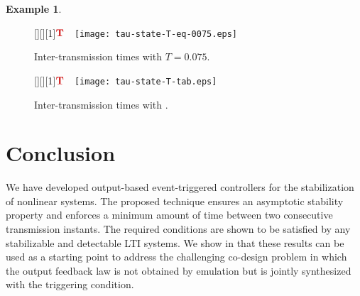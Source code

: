 \documentclass[a4paper, 9pt, twocolumn]{IEEEtran}
\theoremstyle{plain}
\theoremstyle{definition}
\newtheorem{exmple}{Example}
\begin{document}
\begin{exmple}
\begin{figure}[H]
\centering
{}[][][1]{\scriptsize $\color{Red3}\textbf{T}\,\,\,\,$}
\texttt{[image: tau-state-T-eq-0075.eps]}\caption{Inter-transmission times with $T = 0.075$.}
\label{fig:tau-state-clock}
\end{figure}

\begin{figure}[H]
\centering
{}[][][1]{\scriptsize $\color{Red3}\textbf{T}\,\,\,\,$}
\texttt{[image: tau-state-T-tab.eps]} \caption{Inter-transmission times with \cite{Tabuada2007event}.}
\label{fig:tau-state-Tabuada}
\end{figure}
\end{exmple}


\section{Conclusion} \label{sec: conclusions}
We have developed output-based event-triggered controllers for the stabilization of nonlinear systems. The proposed technique ensures an asymptotic stability property and enforces a minimum amount of time between two consecutive transmission instants. The required conditions are shown to be satisfied by any stabilizable and detectable LTI systems. We show in \cite{Abdelrahim2014codesign} that these results can be used as a starting point to address the challenging co-design problem in which the output feedback law is not obtained by emulation but is jointly synthesized with the triggering condition.
\end{document}
